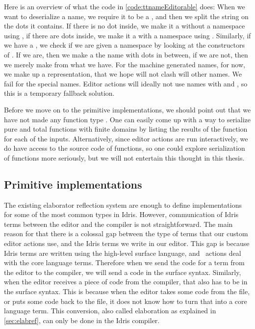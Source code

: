 Here is an overview of what the code in \autoref{code:ttnameEditorable} does:
When we want to deserialize a name, we require it to be a , and
then we split the string  on the dots it contains. If there is no dot
inside, we make it a  without a namespace using , if there
are dots inside, we make it a  with a namespace using .
Similarly, if we have a , we check if we are given a namespace by
looking at the constructors of . If we are, then we make a
 the name with dots in between, if we are not, then we merely make
 from what we have.
For the machine generated names, for now, we make up a representation, that we
hope will not clash will other names.
We fail for the special names. Editor actions will ideally not use names with
 and , so this is a temporary fallback solution.

Before we move on to the primitive  implementations,
we should point out that we have not made any function type .
One can easily come up with a way to serialize pure and total functions with
finite domains by listing the results of the function for each of the inputs.
Alternatively, since editor actions are run interactively, we do have access to
the source code of functions, so one could explore serialization of functions
more seriously, but we will not entertain this thought in this thesis.

\subsection{Primitive  implementations}\label{ssec:primitiveEditorableDesign}

The existing elaborator reflection system are enough to define 
implementations for some of the most common types in Idris.
However, communication of Idris terms between the editor and the compiler is
not straightforward. The main reason for that there is a colossal gap between
the type of terms that our custom editor actions use, and the Idris terms we
write in our editor.
This gap is because Idris terms are written using the high-level surface
language, and \Elab\ actions deal with the core language terms. Therefore when
we send the code for a term from the editor to the compiler, we will send a
code in the surface syntax. Similarly, when the editor receives a piece of code
from the compiler, that also has to be in the surface syntax. This is because
when the editor takes some code from the file, or puts some code back to the
file, it does not know how to turn that into a core language term.
This conversion, also called elaboration as explained in
\autoref{sec:elabref}, can only be done in the Idris compiler.

